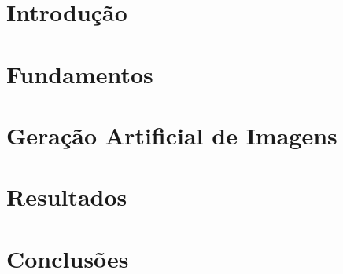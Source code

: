 \documentclass[mestrado, pre-defesa, english, brazil]{packages/icmc}
\begin{document}
\textual

\chapter{Introdução}
\label{cap:introducao}


\chapter{Fundamentos}
\label{cap:fundamentos}


\chapter{Geração Artificial de Imagens}
\label{cap:metodo}


\chapter{Resultados}
\label{cap:resultados}


\chapter{Conclusões}
\label{cap:conclusões}


%

\postextual





\glsaddall
\printglossaries

\end{document}
